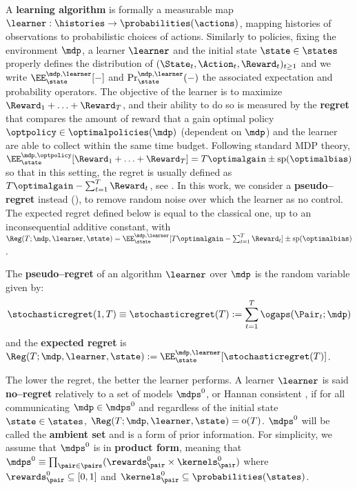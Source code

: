 \documentclass[preprint,cleveref,12pt]{colt2025}
\DeclarePairedDelimiter{\parens}{(}{)}	%
\def\product{\prod}
\newcommand{\vecspan}[1]{\mathrm{sp}\parens{#1}}
\DeclareMathOperator*{\oh}{\mathrm{o}}
\def\model{\mdp}
\def\models{\mdps}
\def\optpolicies{\optimalpolicies}
\def\optgain{\optimalgain} %
\def\optbias{\optimalbias} %
\newcommand{\strong}[1]{\textbf{#1}}
\begin{document}
    A \strong{learning algorithm} is formally a measurable map $\learner : \histories \to \probabilities(\actions)$, mapping histories of observations to probabilistic choices of actions. 
    Similarly to policies, fixing the environment $\model$, a learner $\learner$ and the initial state $\state \in \states$ properly defines the distribution of $(\State_t, \Action_t, \Reward_t)_{t \ge 1}$ and we write $\EE_{\state}^{\model, \learner}[-]$ and $\Pr_{\state}^{\model, \learner}\parens{-}$ the associated expectation and probability operators. 
    The objective of the learner is to maximize $\Reward_1 + \ldots + \Reward_T$, and their ability to do so is measured by the \strong{regret} that compares the amount of reward that a gain optimal policy $\optpolicy \in \optpolicies(\model)$ (dependent on $\model$) and the learner are able to collect within the same time budget. 
    Following standard MDP theory, $\EE_{\state}^{\model, \optpolicy}[\Reward_1 + \ldots + \Reward_T] = T \optgain \pm \vecspan{\optbias}$ so that in this  setting, the regret is usually defined as $T \optgain - \sum_{t=1}^T \Reward_t$, see \cite{auer_near_optimal_2009}. 
    In this work, we consider a \strong{pseudo--regret} instead (), to remove random noise over which the learner as no control.
    The expected regret defined below is equal to the classical one, up to an inconsequential additive constant, with $\Reg(T; \model, \learner, \state) = \EE_{\state}^{\model, \learner}[T \optgain - \sum_{t=1}^T \Reward_t] \pm \vecspan{\optbias}$.

    \begin{definition}
    \label{definition_regret}
        The \strong{pseudo--regret} of an algorithm $\learner$ over $\model$ is the random variable given by:
        \begin{equation}
            \stochasticregret(1, T) 
            \equiv
            \stochasticregret(T) 
            := 
            \sum_{t=1}^T \ogaps(\Pair_t; \model)
        \end{equation}
        and the \strong{expected regret} is $\Reg(T; \model, \learner, \state) := \EE_{\state}^{\model, \learner}[\stochasticregret(T)]$. 
    \end{definition}

    The lower the regret, the better the learner performs.
    A learner $\learner$ is said \strong{no--regret} relatively to a set of models $\models^0$, or {Hannan consistent} \cite{hannan_approximation_1957}, if for all {communicating} $\model \in \models^0$ and regardless of the initial state $\state \in \states$, $\Reg(T; \model, \learner, \state) = \oh(T)$. 
    $\models^0$ will be called the \strong{ambient set} and is a form of prior information.
    For simplicity, we assume that $\models^0$ is in \strong{product form}, meaning that $\models^0 \equiv \product_{\pair \in \pairs} (\rewards_\pair^0 \times \kernels^0_\pair)$ where $\rewards_\pair^0 \subseteq [0, 1]$ and $\kernels_\pair^0 \subseteq \probabilities(\states)$. 
    
\end{document}
